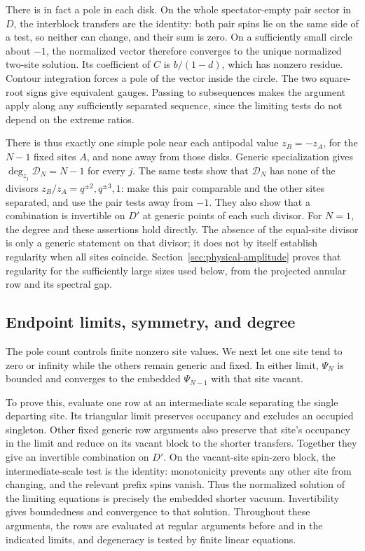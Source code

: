 There is in fact a pole in each disk. On the whole spectator-empty pair sector in \(D\), the interblock transfers are the identity: both pair spins lie on the same side of a test, so neither can change, and their sum is zero. On a sufficiently small circle about \(-1\), the normalized vector therefore converges to the unique normalized two-site solution. Its coefficient of \(C\) is \(b/(1-d)\), which has nonzero residue. Contour integration forces a pole of the vector inside the circle. The two square-root signs give equivalent gauges. Passing to subsequences makes the argument apply along any sufficiently separated sequence, since the limiting tests do not depend on the extreme ratios.

There is thus exactly one simple pole near each antipodal value \(z_B=-z_A\), for the \(N-1\) fixed sites \(A\), and none away from those disks. Generic specialization gives \(\deg_{z_j}\mathscr D_N=N-1\) for every \(j\). The same tests show that \(\mathscr D_N\) has none of the divisors \(z_B/z_A=q^{\pm2},q^{\pm3},1\): make this pair comparable and the other sites separated, and use the pair tests away from \(-1\). They also show that a combination is invertible on \(D'\) at generic points of each such divisor. For \(N=1\), the degree and these assertions hold directly. The absence of the equal-site divisor is only a generic statement on that divisor; it does not by itself establish regularity when all sites coincide. Section~\ref{sec:physical-amplitude} proves that regularity for the sufficiently large sizes used below, from the projected annular row and its spectral gap.

\subsection{Endpoint limits, symmetry, and degree}

The pole count controls finite nonzero site values. We next let one site tend to zero or infinity while the others remain generic and fixed. In either limit, \(\Psi_N\) is bounded and converges to the embedded \(\Psi_{N-1}\) with that site vacant.

To prove this, evaluate one row at an intermediate scale separating the single departing site. Its triangular limit preserves occupancy and excludes an occupied singleton. Other fixed generic row arguments also preserve that site's occupancy in the limit and reduce on its vacant block to the shorter transfers. Together they give an invertible combination on \(D'\). On the vacant-site spin-zero block, the intermediate-scale test is the identity: monotonicity prevents any other site from changing, and the relevant prefix spins vanish. Thus the normalized solution of the limiting equations is precisely the embedded shorter vacuum. Invertibility gives boundedness and convergence to that solution. Throughout these arguments, the rows are evaluated at regular arguments before and in the indicated limits, and degeneracy is tested by finite linear equations.


